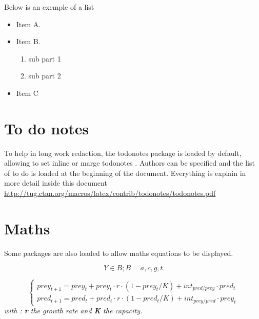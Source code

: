 \documentclass[12pt,a4paper,notitlepage,colorinlistoftodos]{article}
\begin{document}
Below is an exemple of a list

\begin{itemize}
  \item Item A.
  \item Item B.
  \begin{enumerate}
  	\item sub part 1
  	\item sub part 2
  \end{enumerate}
  \item Item C
\end{itemize}

\section{To do notes}

To help in long work redaction, the todonotes package is loaded by default, allowing to set inline or marge todonotes . Authors can be specified and the list of to do is loaded at the beginning of the document. Everything is explain in more detail inside this document \url{http://tug.ctan.org/macros/latex/contrib/todonotes/todonotes.pdf}


% 

\section{Maths}

Some packages are also loaded to allow maths equations to be displayed.

\begin{equation}
Y \in B;  B = {a,c,g,t}
\label{eq:11}
\end{equation}

\begin{equation}
\begin{cases}
prey_{t+1} = prey_{t} + prey_{t} \cdot r \cdot (1 - prey_{t} / K ) + int_{pred/prey} \cdot pred_{t} \\
pred_{t+1} = pred_{t} + pred_{t} \cdot r \cdot (1 - pred_{t} / K ) + int_{prey/pred} \cdot prey_{t}
\end{cases}
\label{eq:lotk}
\end{equation}
\textit{with : \textbf{r} the growth rate and \textbf{K} the capacity.} \\
\end{document}
